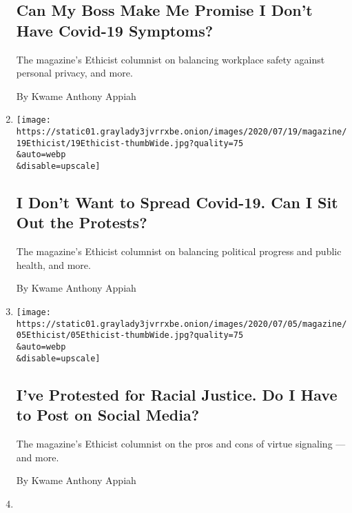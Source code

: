 \begin{enumerate}
  \hypertarget{can-my-boss-make-me-promise-i-dont-have-covid-19-symptoms}{%
  \subsection{Can My Boss Make Me Promise I Don't Have Covid-19
  Symptoms?}\label{can-my-boss-make-me-promise-i-dont-have-covid-19-symptoms}}

  The magazine's Ethicist columnist on balancing workplace safety
  against personal privacy, and more.

  By Kwame Anthony Appiah
\item
  \href{/2020/07/14/magazine/i-dont-want-to-spread-covid-19-can-i-sit-out-the-protests.html}{}

  \texttt{[image: https://static01.graylady3jvrrxbe.onion/images/2020/07/19/magazine/19Ethicist/19Ethicist-thumbWide.jpg?quality=75\\\&auto=webp\\\&disable=upscale]}

  \hypertarget{i-dont-want-to-spread-covid-19-can-i-sit-out-the-protests}{%
  \subsection{I Don't Want to Spread Covid-19. Can I Sit Out the
  Protests?}\label{i-dont-want-to-spread-covid-19-can-i-sit-out-the-protests}}

  The magazine's Ethicist columnist on balancing political progress and
  public health, and more.

  By Kwame Anthony Appiah
\item
  \href{/2020/06/30/magazine/ive-protested-for-racial-justice-do-i-have-to-post-on-social-media.html}{}

  \texttt{[image: https://static01.graylady3jvrrxbe.onion/images/2020/07/05/magazine/05Ethicist/05Ethicist-thumbWide.jpg?quality=75\\\&auto=webp\\\&disable=upscale]}

  \hypertarget{ive-protested-for-racial-justice-do-i-have-to-post-on-social-media}{%
  \subsection{I've Protested for Racial Justice. Do I Have to Post on
  Social
  Media?}\label{ive-protested-for-racial-justice-do-i-have-to-post-on-social-media}}

  The magazine's Ethicist columnist on the pros and cons of virtue
  signaling --- and more.

  By Kwame Anthony Appiah
\item
  \href{/2020/06/23/magazine/should-i-call-the-cops-on-my-stepson.html}{}


\end{enumerate}
